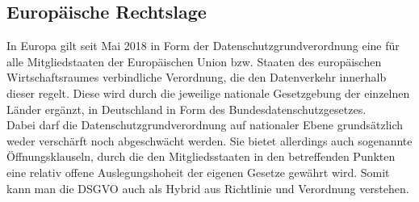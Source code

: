 \subsection{Europäische Rechtslage}
    In Europa gilt seit Mai 2018 in Form der \glqq Datenschutzgrundverordnung\grqq{} eine für alle Mitgliedstaaten der Europäischen Union bzw. Staaten des europäischen Wirtschaftsraumes verbindliche Verordnung, die den Datenverkehr innerhalb dieser regelt. Diese wird durch die jeweilige nationale Gesetzgebung der einzelnen Länder ergänzt, in Deutschland in Form des Bundesdatenschutzgesetzes.\\
    Dabei darf die Datenschutzgrundverordnung auf nationaler Ebene grundsätzlich weder verschärft noch abgeschwächt werden. Sie bietet allerdings auch sogenannte Öffnungsklauseln, durch die den Mitgliedsstaaten in den betreffenden Punkten eine relativ offene Auslegungshoheit der eigenen Gesetze gewährt wird. Somit kann man die DSGVO auch als Hybrid aus Richtlinie und Verordnung verstehen.

